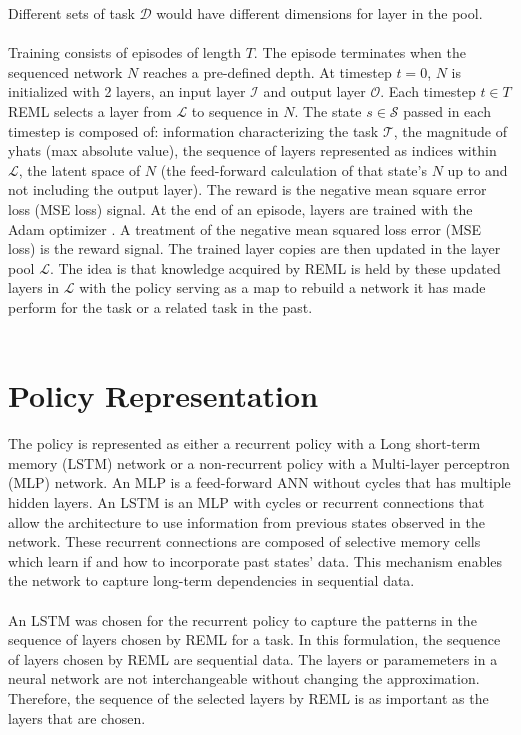 Different sets of task $\mathcal{D}$ would have different dimensions for layer in
the pool.
\\\\
Training consists of episodes of length $T$. The episode terminates when the 
sequenced network $N$ reaches a pre-defined depth. At timestep $t=0$, $N$ is initialized
with 2 layers, an input layer $\mathcal{I}$ and output layer $\mathcal{O}$. 
Each timestep $t \in T$ REML selects a layer from $\mathcal{L}$ to sequence in $N$. 
The state $s \in \mathcal{S}$ passed in each timestep is composed of: information 
characterizing the task $\mathcal{T}$, 
the magnitude of yhats (max absolute value), 
the sequence of layers represented as indices within $\mathcal{L}$, 
the latent space of $N$ (the feed-forward calculation of that state's $N$ up to and 
not including the output layer). 
The reward is the negative mean square error loss (MSE loss) signal. 
At the end of an episode, layers are trained with the Adam optimizer \cite{KinBa:14}. A treatment of the negative mean 
squared loss error (MSE loss) is the reward signal. 
The trained layer copies are then updated in the layer pool $\mathcal{L}$. 
The idea is that knowledge acquired by REML is held by these updated layers in 
$\mathcal{L}$ with the policy serving as a map to rebuild a network it has made 
perform for the task or a related task in the past.
\\\\
\section{Policy Representation}
The policy is represented as either a recurrent policy with a Long short-term 
memory (LSTM) network or a non-recurrent policy with a Multi-layer perceptron (MLP) 
network. An MLP is a feed-forward ANN without cycles that has multiple hidden layers.
An LSTM is an MLP with cycles or recurrent connections that allow the architecture 
to use information from previous states observed in the network. These recurrent 
connections are composed of selective memory cells which learn if and how to 
incorporate past states' data. This mechanism enables the network to capture long-term
dependencies in sequential data.
\\\\
An LSTM was chosen for the recurrent policy to capture the patterns in the sequence 
of layers chosen by REML for a task. In this formulation, the sequence
of layers chosen by REML are sequential data. The layers or paramemeters in 
a neural network are not interchangeable without changing the approximation. 
Therefore, the sequence of the selected layers by REML is as important as the layers
that are chosen.

